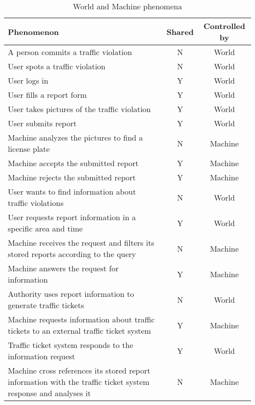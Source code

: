 \begin{table}[H]
    \centering
    \begin{tabular}{|p{10cm}|c|c|}
    \hline
    \textbf{Phenomenon} & \textbf{Shared} & \textbf{Controlled by} \\ \hline
    A person commits a traffic violation & N & World \\ \hline
    User spots a traffic violation & N & World \\ \hline
    User logs in & Y & World \\ \hline
    User fills a report form & Y & World \\ \hline
    User takes pictures of the traffic violation & Y & World \\ \hline
    User submits report & Y & World \\ \hline
    Machine analyzes the pictures to find a license plate & N & Machine \\ \hline
    Machine accepts the submitted report & Y & Machine \\ \hline
    Machine rejects the submitted report & Y & Machine \\ \hline
    User wants to find information about traffic violations & N & World \\ \hline
    User requests report information in a specific area and time & Y & World \\ \hline
    Machine receives the request and filters its stored reports according to the query & N & Machine \\ \hline
    Machine answers the request for information & Y & Machine \\ \hline
    Authority uses report information to generate traffic tickets & N & World \\ \hline
    Machine requests information about traffic tickets to an external traffic ticket system & Y & Machine \\ \hline
    Traffic ticket system responds to the information request & Y & World \\ \hline
    Machine cross references its stored report information with the traffic ticket system response and analyses it & N & Machine \\ \hline
    \end{tabular}
    \caption{\label{tbl} World and Machine phenomena}
    \end{table}

